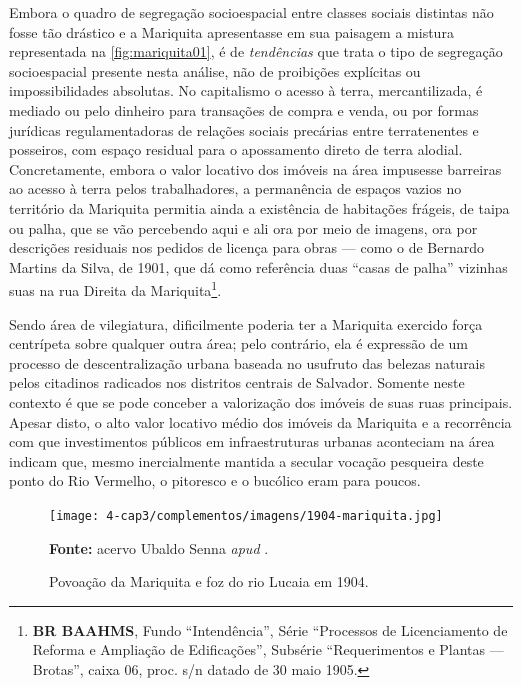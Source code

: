 
Embora o quadro de segregação socioespacial entre classes sociais distintas não fosse tão drástico e a Mariquita apresentasse em sua paisagem a mistura representada na \autoref{fig:mariquita01}, é de \textit{tendências} que trata o tipo de segregação socioespacial presente nesta análise, não de proibições explícitas ou impossibilidades absolutas. No capitalismo o acesso à terra, mercantilizada, é mediado ou pelo dinheiro para transações de compra e venda, ou por formas jurídicas regulamentadoras de relações sociais precárias entre terratenentes e posseiros, com espaço residual para o apossamento direto de terra alodial. Concretamente, embora o valor locativo dos imóveis na área impusesse barreiras ao acesso à terra pelos trabalhadores, a permanência de espaços vazios no território da Mariquita permitia ainda a existência de habitações frágeis, de taipa ou palha, que se vão percebendo aqui e ali ora por meio de imagens, ora por descrições residuais nos pedidos de licença para obras --- como o de Bernardo Martins da Silva, de 1901, que dá como referência duas ``casas de palha'' vizinhas suas na rua Direita da Mariquita\footnote{\textbf{BR BAAHMS}, Fundo ``Intendência'', Série ``Processos de Licenciamento de Reforma e Ampliação de Edificações'', Subsérie ``Requerimentos e Plantas --- Brotas'', caixa 06, proc. s/n datado de 30 maio 1905.}.

Sendo área de vilegiatura, dificilmente poderia ter a Mariquita exercido força centrípeta sobre qualquer outra área; pelo contrário, ela é expressão de um processo de descentralização urbana baseada no usufruto das belezas naturais pelos citadinos radicados nos distritos centrais de Salvador. Somente neste contexto é que se pode conceber a valorização dos imóveis de suas ruas principais. Apesar disto, o alto valor locativo médio dos imóveis da Mariquita e a recorrência com que investimentos públicos em infraestruturas urbanas aconteciam na área indicam que, mesmo inercialmente mantida a secular vocação pesqueira deste ponto do Rio Vermelho, o pitoresco e o bucólico eram para poucos. 


\begin{figure}[!htp]
\centering
\caption{Povoação da Mariquita e foz do rio Lucaia em 1904.}\texttt{[image: 4-cap3/complementos/imagens/1904-mariquita.jpg]}{\par \footnotesize \textbf{Fonte:} acervo Ubaldo Senna \textit{apud} . }
\label{fig:mariquita01}
\end{figure}

